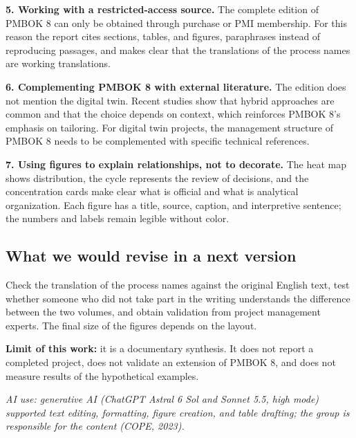 \documentclass[12pt,a4paper,article,oneside,brazil,english]{abntex2}
\begin{document}
\textbf{5. Working with a restricted-access source.} The complete edition of PMBOK 8 can only be obtained through purchase or PMI membership. For this reason the report cites sections, tables, and figures, paraphrases instead of reproducing passages, and makes clear that the translations of the process names are working translations.

\textbf{6. Complementing PMBOK 8 with external literature.} The edition does not mention the digital twin. Recent studies show that hybrid approaches are common and that the choice depends on context, which reinforces PMBOK 8's emphasis on tailoring. For digital twin projects, the management structure of PMBOK 8 needs to be complemented with specific technical references.

\textbf{7. Using figures to explain relationships, not to decorate.} The heat map shows distribution, the cycle represents the review of decisions, and the concentration cards make clear what is official and what is analytical organization. Each figure has a title, source, caption, and interpretive sentence; the numbers and labels remain legible without color.

\subsection*{What we would revise in a next version}

Check the translation of the process names against the original English text, test whether someone who did not take part in the writing understands the difference between the two volumes, and obtain validation from project management experts. The final size of the figures depends on the layout.

\textbf{Limit of this work:} it is a documentary synthesis. It does not report a completed project, does not validate an extension of PMBOK 8, and does not measure results of the hypothetical examples.

\vspace{\onelineskip}
{\footnotesize\SingleSpacing\noindent\textit{AI use: generative AI (ChatGPT Astral 6 Sol and Sonnet 5.5, high mode) supported text editing, formatting, figure creation, and table drafting; the group is responsible for the content (COPE, 2023).}\par}
\end{document}
